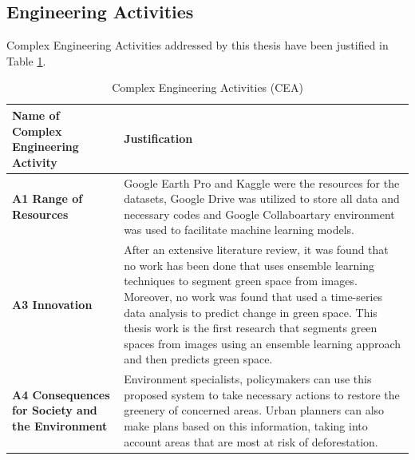 \subsection{Engineering Activities}
 Complex Engineering Activities addressed by this thesis have been justified in Table \ref{table_OBE2}.                            
 \begin{table}[ht]
    \centering
    \caption{Complex Engineering Activities (CEA)}
    \begin{tabular}{p{.27\linewidth} p{.67\linewidth}}
        \hline
        Name of Complex \newline Engineering Activity & Justification \\ \hline
\textbf{A1 \newline Range of Resources}   &  Google Earth Pro and Kaggle were the resources for the datasets, Google Drive was utilized to store all data and necessary codes and Google Collaboartary environment was used to facilitate machine learning models. \\ [0.75em]
\textbf{A3 \newline  Innovation } & After an extensive literature review, it was found that no work has been done that uses ensemble learning techniques to segment green space from images. Moreover, no work was found that used a time-series data analysis to predict change in green space. This thesis work is the first research that segments green spaces from images using an ensemble learning approach and then predicts green space. \\ [0.75em]
\textbf{A4 \newline  Consequences for \newline Society and the \newline Environment} &  Environment specialists, policymakers can use this proposed system to take necessary actions to restore the greenery of concerned areas.
Urban planners can also make plans based on this information, taking into account areas that are most at risk of deforestation.
\\
        \hline
    \end{tabular}
    \label{table_OBE2}
\end{table}